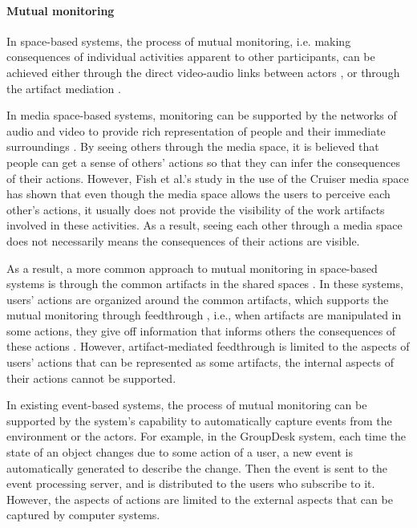 \paragraph*{Mutual monitoring} %
\label{par:mutual_monitoring}
In space-based systems, the process of mutual monitoring, i.e. making consequences of individual activities apparent to other participants, can be achieved either through the direct video-audio links between actors \cite{Dourish1992}, or through the artifact mediation \cite{Tee2009}. 

In media space-based systems, monitoring can be supported by the networks of audio and video to provide rich representation of people and their immediate surroundings \cite{Dourish1992}. By seeing others through the media space, it is believed that people can get a sense of others' actions so that they can infer the consequences of their actions. However, Fish et al.'s study in the use of the Cruiser media space \cite{Fish1992} has shown that even though the media space allows the users to perceive each other's actions, it usually does not provide the visibility of the work artifacts involved in these activities. As a result, seeing each other through a media space does not necessarily means the consequences of their actions are visible. 

As a result, a more common approach to mutual monitoring in space-based systems is through the common artifacts in the shared spaces \cite{Berlage1999}. In these systems, users' actions are organized around the common artifacts, which supports the mutual monitoring through feedthrough \cite{dix1997challenges}, i.e., when artifacts are manipulated in some actions, they give off information that informs others the consequences of these actions \cite{Tee2009}. However, artifact-mediated feedthrough is limited to the aspects of users' actions that can be represented as some artifacts, the internal aspects of their actions cannot be supported.

In existing event-based systems, the process of mutual monitoring can be supported by the system's capability to automatically capture events from the environment or the actors. For example, in the GroupDesk \cite{Fuchs1995} system, each time the state of an object changes due to some action of a user, a new event is automatically generated to describe the change. Then the event is sent to the event processing server, and is distributed to the users who subscribe to it. However, the aspects of actions are limited to the external aspects that can be captured by computer systems.

